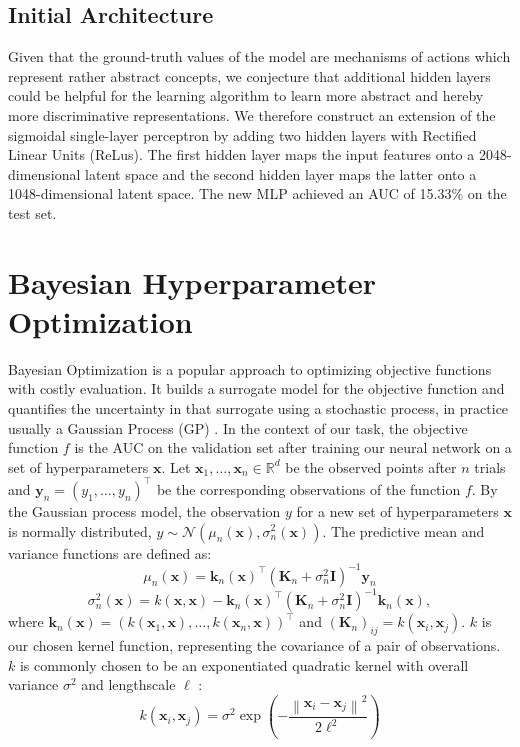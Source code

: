 \documentclass[bsc,frontabs,twoside,singlespacing,parskip,deptreport]{infthesis}     %
\let\Oldsection\section
\renewcommand{\section}{\FloatBarrier\Oldsection}
\let\Oldsubsection\subsection
\renewcommand{\subsection}{\FloatBarrier\Oldsubsection}
\begin{document}
\subsection{Initial Architecture}
Given that the ground-truth values of the model are mechanisms of actions which represent rather abstract concepts, we conjecture that additional hidden layers could be helpful for the learning algorithm to learn more abstract and hereby more discriminative representations. 
We therefore construct an extension of the sigmoidal single-layer perceptron by adding two hidden layers with Rectified Linear Units (ReLus). The first hidden layer maps the input features onto a 2048-dimensional latent space and the second hidden layer maps the latter onto a 1048-dimensional latent space. The new MLP achieved an AUC of 15.33\% on the test set.

\section{Bayesian Hyperparameter Optimization}
Bayesian Optimization is a popular approach to optimizing objective functions with costly evaluation. It builds a surrogate model for the objective function and quantifies the uncertainty in that surrogate using a stochastic process, in practice usually a Gaussian Process (GP) \cite{frazier_tutorial_2018}.
In the context of our task, the objective function \(f\) is the AUC on the validation set after training our neural network on a set of hyperparameters \(\mathbf{x}\). 
Let \(\mathbf{x}_{1}, \ldots, \mathbf{x}_{n} \in \mathbb{R}^{d}\) be the observed points after \(n\) trials and \(\mathbf{y}_{n}=\left(y_{1}, \ldots, y_{n}\right)^{\top}\) be the corresponding observations of the function \(f\).
By the Gaussian process model, the observation \(y\) for a new set of hyperparameters \(\mathbf{x}\) is normally distributed, \(y \sim \mathcal{N}\left(\mu_n(\mathbf{x}), \sigma_n^{2}(\mathbf{x})\right)\). The predictive mean and  variance functions are defined as:
\[\mu_{n}(\mathbf{x})=\mathbf{k}_{n}(\mathbf{x})^{\top}\left(\mathbf{K}_{n}+\sigma_{n}^{2} \mathbf{I}\right)^{-1} \mathbf{y}_{n}\]
\[\sigma_{n}^{2}(\mathbf{x})=k(\mathbf{x}, \mathbf{x})-\mathbf{k}_{n}(\mathbf{x})^{\top}\left(\mathbf{K}_{n}+\sigma_{n}^{2} \mathbf{I}\right)^{-1} \mathbf{k}_{n}(\mathbf{x}),\]
where
\(\mathbf{k}_{n}(\mathbf{x})=\left(k\left(\mathbf{x}_{1}, \mathbf{x}\right), \ldots, k\left(\mathbf{x}_{n}, \mathbf{x}\right)\right)^{\top}\)
and \(\left(\mathbf{K}_{n}\right)_{i j}=k\left(\mathbf{x}_{i}, \mathbf{x}_{j}\right)\). \(k\) is our chosen kernel function, representing the covariance of a pair of observations. \(k\) is commonly chosen to be an exponentiated quadratic kernel with overall variance \(\sigma^{2}\) and lengthscale \(\ell\) :
\[k\left(\mathbf{x}_{i}, \mathbf{x}_{j}\right)=\sigma^{2} \exp \left(-\frac{\left\|\mathbf{x}_{i}-\mathbf{x}_{j}\right\|^{2}}{2 \ell^{2}}\right)\]
\end{document}
